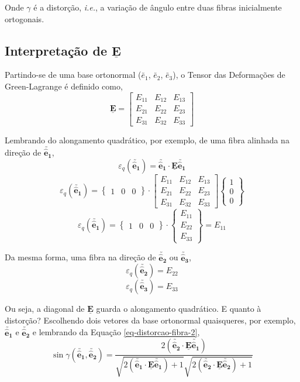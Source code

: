 	Onde $\gamma$ é a distorção, \textit{i.e.}, a variação de ângulo entre duas fibras inicialmente ortogonais.
	
	\subsection{Interpretação de $\underline{\mathbf{E}}$}
	
	Partindo-se de uma base ortonormal ($\utilde{e_1}$, $\utilde{e_2}$, $\utilde{e_3}$), o Tensor das Deformações de Green-Lagrange é definido como,
	\[
	\underline{\mathbf{E}}
	=
	\begin{bmatrix}
	E_{11} & E_{12} & E_{13} \\
	E_{21} & E_{22} & E_{23} \\
	E_{31} & E_{32} & E_{33}
	\end{bmatrix}
	\]
	
	Lembrando do alongamento quadrático, por exemplo, de uma fibra alinhada na direção de $\utilde{\mathbf{\hat{e}_1}}$,
	\[\varepsilon_q(\utilde{\mathbf{\hat{e}_1}})=\utilde{\mathbf{\hat{e}_1}}\cdot\underline{\mathbf{E}}\utilde{\mathbf{\hat{e}_1}}\]
	\[
	\varepsilon_q(\utilde{\mathbf{\hat{e}_1}})
	=
	\begin{Bmatrix}
	1 & 0 & 0
	\end{Bmatrix}
	\cdot
	\begin{bmatrix}
	E_{11} & E_{12} & E_{13} \\
	E_{21} & E_{22} & E_{23} \\
	E_{31} & E_{32} & E_{33}
	\end{bmatrix}
	\begin{Bmatrix}
	1 \\ 0 \\ 0
	\end{Bmatrix}
	\]
	\[
	\varepsilon_q(\utilde{\mathbf{\hat{e}_1}})
	=
	\begin{Bmatrix}
	1 & 0 & 0
	\end{Bmatrix}
	\cdot
	\begin{Bmatrix}
	E_{11} \\ E_{22} \\ E_{33}
	\end{Bmatrix}
	=
	E_{11}
	\]
	
	Da mesma forma, uma fibra na direção de $\utilde{\mathbf{\hat{e}_2}}$ ou $\utilde{\mathbf{\hat{e}_3}}$,
	\[\varepsilon_q(\utilde{\mathbf{\hat{e}_2}})=E_{22}\]
	\[\varepsilon_q(\utilde{\mathbf{\hat{e}_3}})=E_{33}\]
	
	Ou seja, a diagonal de $\underline{\mathbf{E}}$ guarda o alongamento quadrático. E quanto à distorção? Escolhendo dois vetores da base ortonormal quaisqueres, por exemplo, $\utilde{\mathbf{\hat{e}_1}}$ e $\utilde{\mathbf{\hat{e}_2}}$ e lembrando da Equação \eqref{eq-distorcao-fibra-2},
	\begin{equation}\label{eq-distorcao-fibra-3}
		\sin\gamma(\utilde{\mathbf{\hat{e}_1}},\utilde{\mathbf{\hat{e}_2}})=\frac{2(\utilde{\mathbf{\hat{e}_2}}\cdot\underline{\mathbf{E}}\utilde{\mathbf{\hat{e}_1}})}{\displaystyle\sqrt{2(\utilde{\mathbf{\hat{e}_1}}\cdot\underline{\mathbf{E}}\utilde{\mathbf{\hat{e}_1}})+1}\sqrt{2(\utilde{\mathbf{\hat{e}_2}}\cdot\underline{\mathbf{E}}\utilde{\mathbf{\hat{e}_2}})+1}}
	\end{equation}
	
